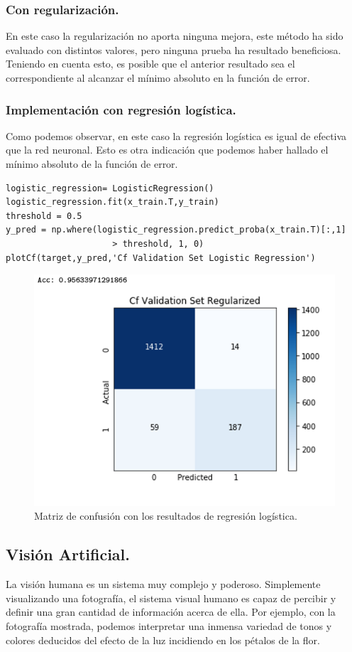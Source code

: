 \documentclass[a4paper,11pt]{article}
\begin{document}
\subsubsection{Con regularización.}
En este caso la regularización no aporta ninguna mejora, este método ha sido evaluado con distintos valores, pero ninguna prueba ha resultado beneficiosa. Teniendo en cuenta esto, es posible que el anterior resultado sea el correspondiente al alcanzar el mínimo absoluto en la función de error.

\subsubsection{Implementación con regresión logística.}
Como podemos observar, en este caso la regresión logística es igual de efectiva que la red neuronal. Esto es otra indicación que podemos haber hallado el mínimo absoluto de la función de error.
\begin{lstlisting}
logistic_regression= LogisticRegression()
logistic_regression.fit(x_train.T,y_train)
threshold = 0.5
y_pred = np.where(logistic_regression.predict_proba(x_train.T)[:,1]
					 > threshold, 1, 0)
plotCf(target,y_pred,'Cf Validation Set Logistic Regression')
\end{lstlisting}
\begin{figure}[H]
\centering
\includegraphics[scale=0.6]{Annotation 2020-03-23 161410}
\caption{Matriz de confusión con los resultados de regresión logística.}
\end{figure}
\newpage
\subsection{Visión Artificial.}
La visión humana es un sistema muy complejo y poderoso. Simplemente
visualizando una fotografía, el sistema visual humano es capaz
de percibir y definir una gran cantidad de información acerca de ella. Por ejemplo, con la fotografía mostrada, podemos interpretar una inmensa variedad de tonos y colores deducidos del efecto de la luz incidiendo en los pétalos de la flor.\\
\end{document}
